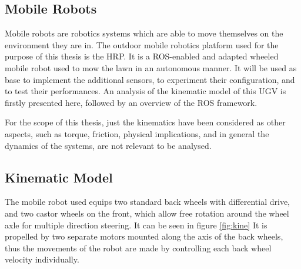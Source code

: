 

\subsection{Mobile Robots}

\noindent Mobile robots are robotics systems which are able to move themselves on the environment they are in. 
The outdoor mobile robotics platform used for the purpose of this thesis is the \gls{HRP}.
It is a \Gls{ROS}-enabled and adapted wheeled mobile robot used to mow the lawn in an autonomous manner.
It will be used as base to implement the additional sensors, to experiment their configuration, and to test their performances.
An analysis of the kinematic model of this \Gls{UGV} is firstly presented here, followed by an overview of the \gls{ROS} framework.

For the scope of this thesis, just the kinematics have been considered as other aspects, such as torque, friction, physical implications, and in general the dynamics of the systems, are not relevant to be analysed.


\subsection{Kinematic Model}

\noindent The mobile robot used equips two standard back wheels with differential drive, and two castor wheels on the front, which allow free rotation around the wheel axle for multiple direction steering. It can be seen in figure \ref{fig:kine}
It is propelled by two separate motors mounted along the axis of the back wheels, thus the movements of the robot are made by controlling each back wheel velocity individually.

